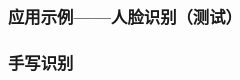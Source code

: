 \documentclass{beamer}
\begin{document}
{{\begin{frame}
  {\hspace{4em}}
\end{frame}}{\begin{frame}
  \frametitle{应用示例------人脸识别（测试）}
  
  {\hspace{4em}}
\end{frame}}{\begin{frame}
  \frametitle{手写识别}
  

\end{frame}}}
\end{document}
